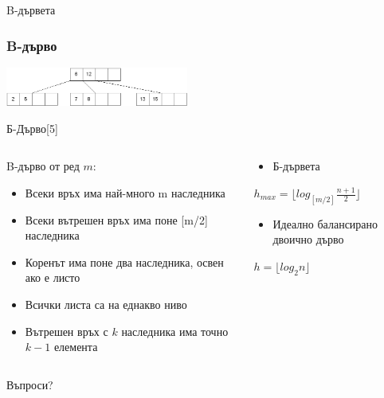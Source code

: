 \documentclass{beamer}
\begin{document}
\begin{frame}
  \centerline{B-дървета}
\end{frame}

\begin{frame}[fragile]
  \frametitle{B-дърво}
  \begin{center}
    \includegraphics[width=6cm]{images/btree_example_1}
    
    \bigskip
    Б-Дърво[5]
  \end{center}


  \begin{columns}[t]
    \begin{column}{0.5\textwidth}
      B-дърво от ред $m$:
      \begin{itemize}
        \item Всеки връх има най-много m наследника
        \item Всеки вътрешен връх има поне [m/2] наследника
        \item Коренът има поне два наследника, освен ако е листо
        \item Всички листа са на еднакво ниво
        \item Вътрешен връх с $k$ наследника има точно $k-1$ елемента
      \end{itemize}
    \end{column}
    \begin{column}{0.5\textwidth}
      \begin{itemize}
        \item Б-дървета
      \end{itemize}
      $h_{max} = \lfloor log_{[m/2]}\frac{n+1}{2} \rfloor$
      \begin{itemize}
        \item Идеално балансирано двоично дърво
      \end{itemize}
      $h=\lfloor log_2{n} \rfloor$

    \end{column}
  \end{columns}
  

\end{frame}

\begin{frame}
\centerline{Въпроси?}
\end{frame}
\end{document}
